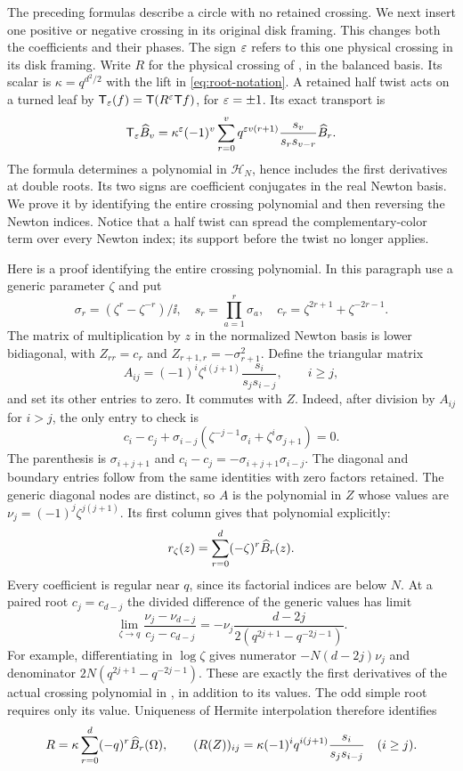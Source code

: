 The preceding formulas describe a circle with no retained crossing. We next insert one positive or negative crossing in its original disk framing. This changes both the coefficients and their phases. The sign $\varepsilon$ refers to this one physical crossing in its disk framing.
Write $R$ for the physical crossing of
\cite[Proposition 5.1]{Finite}, in the balanced basis. Its scalar is
$\kappa=q^{d^2/2}$ with the lift in \eqref{eq:root-notation}.
A retained half twist acts on a turned leaf by
$\mathsf T_\varepsilon(f)=\mathsf T(R^\varepsilon\mathsf T f)$, for $\varepsilon=\pm1$. Its exact transport is
\begin{equation}\label{eq:half-twist}
 \mathsf T_\varepsilon\widehat B_v=\kappa^\varepsilon(-1)^v
 \sum_{r=0}^{v}q^{\varepsilon v(r+1)}
 \frac{s_v}{s_rs_{v-r}}\widehat B_r.
\end{equation}
The formula determines a polynomial in $\mathcal H_N$, hence includes
the first derivatives at double roots. Its two signs are coefficient
conjugates in the real Newton basis. We prove it by identifying the
entire crossing polynomial and then reversing the Newton indices.
Notice that a half twist can spread the complementary-color term
over every Newton index; its support before the twist no longer applies.


Here is a proof identifying the entire crossing polynomial. In this
paragraph use a generic parameter $\zeta$ and put
\[
 \sigma_r=(\zeta^r-\zeta^{-r})/\ii,\quad
 s_r=\prod_{a=1}^r\sigma_a,\quad
 c_r=\zeta^{2r+1}+\zeta^{-2r-1}.
\]
The matrix of multiplication by $z$ in the normalized Newton basis
is lower bidiagonal, with $Z_{rr}=c_r$ and
$Z_{r+1,r}=-\sigma_{r+1}^2$. Define the triangular matrix
\[
 A_{ij}=(-1)^i\zeta^{i(j+1)}\frac{s_i}{s_js_{i-j}},
 \qquad i\ge j,
\]
and set its other entries to zero. It commutes with $Z$.
Indeed, after division by $A_{ij}$ for $i>j$, the only entry to
check is
\[
 c_i-c_j+\sigma_{i-j}
       (\zeta^{-j-1}\sigma_i+\zeta^i\sigma_{j+1})=0.
\]
The parenthesis is $\sigma_{i+j+1}$ and
$c_i-c_j=-\sigma_{i+j+1}\sigma_{i-j}$. The diagonal and boundary
entries follow from the same identities with zero factors retained.
The generic diagonal nodes are distinct, so $A$ is the polynomial
in $Z$ whose values are $\nu_j=(-1)^j\zeta^{j(j+1)}$.
Its first column gives that polynomial explicitly:
\[
 r_\zeta(z)=\sum_{r=0}^d(-\zeta)^r\widehat B_r(z).
\]
Every coefficient is regular near $q$, since its factorial indices
are below $N$. At a paired root $c_j=c_{d-j}$ the divided difference
of the generic values has limit
\[
 \lim_{\zeta\to q}
 \frac{\nu_j-\nu_{d-j}}{c_j-c_{d-j}}
 =-\nu_j\frac{d-2j}{2(q^{2j+1}-q^{-2j-1})}.
\]
For example, differentiating in $\log\zeta$ gives numerator
$-N(d-2j)\nu_j$ and denominator
$2N(q^{2j+1}-q^{-2j-1})$. These are exactly the first derivatives
of the actual crossing polynomial in \cite[Proposition 5.1]{Finite},
in addition to its values. The odd simple root requires only its
value. Uniqueness of Hermite interpolation therefore identifies
\begin{equation}\label{nt:crossing-newton}
 R=\kappa\sum_{r=0}^d(-q)^r\widehat B_r(\Omega),\qquad
 (R(Z))_{ij}=\kappa(-1)^i q^{i(j+1)}
                           \frac{s_i}{s_js_{i-j}}\quad(i\ge j).
\end{equation}

